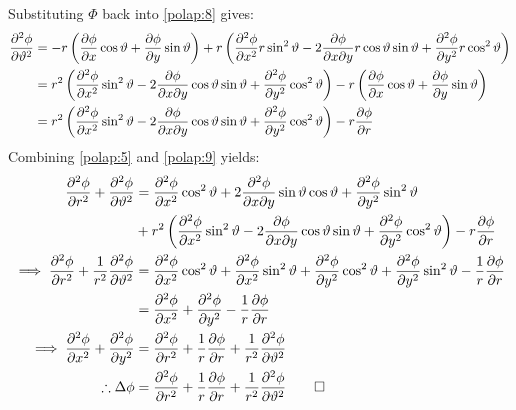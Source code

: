 Substituting $\Phi$ back into \ref{polap:8} gives:
\begin{align}
	\notag\frac{\partial^2\phi}{\partial\vartheta^2}&=-r\left(\frac{\partial \phi}{\partial x}\cos\vartheta+\frac{\partial \phi}{\partial y}\sin\vartheta\right)+r\left(\frac{\partial^2\phi}{\partial x^2}r\sin^2\vartheta-2\frac{\partial\phi}{\partial x\partial y}r\cos\vartheta\sin\vartheta+\frac{\partial^2\phi}{\partial y^2}r\cos^2\vartheta\right)\\
	\notag&=r^2\left(\frac{\partial^2\phi}{\partial x^2}\sin^2\vartheta-2\frac{\partial\phi}{\partial x\partial y}\cos\vartheta\sin\vartheta+\frac{\partial^2\phi}{\partial y^2}\cos^2\vartheta\right)-r\left(\frac{\partial \phi}{\partial x}\cos\vartheta+\frac{\partial \phi}{\partial y}\sin\vartheta\right)\\
	\label{polap:9}&=r^2\left(\frac{\partial^2\phi}{\partial x^2}\sin^2\vartheta-2\frac{\partial\phi}{\partial x\partial y}\cos\vartheta\sin\vartheta+\frac{\partial^2\phi}{\partial y^2}\cos^2\vartheta\right)-r\frac{\partial \phi}{\partial r}
\end{align}
Combining \ref{polap:5} and \ref{polap:9} yields:
\begin{align}
	\notag\frac{\partial^2\phi}{\partial r^2}+\frac{\partial^2\phi}{\partial\vartheta^2}&=\frac{\partial^2\phi}{\partial x^2}\cos^2\vartheta+2\frac{\partial^2\phi}{\partial x\partial y}\sin\vartheta\cos\vartheta+\frac{\partial^2\phi}{\partial y^2}\sin^2\vartheta\\
	\notag&+r^2\left(\frac{\partial^2\phi}{\partial x^2}\sin^2\vartheta-2\frac{\partial\phi}{\partial x\partial y}\cos\vartheta\sin\vartheta+\frac{\partial^2\phi}{\partial y^2}\cos^2\vartheta\right)-r\frac{\partial \phi}{\partial r}\\
	\notag\implies\frac{\partial^2\phi}{\partial r^2}+\frac{1}{r^2}\frac{\partial^2\phi}{\partial\vartheta^2}&=\frac{\partial^2\phi}{\partial x^2}\cos^2\vartheta+\frac{\partial^2\phi}{\partial x^2}\sin^2\vartheta+\frac{\partial^2\phi}{\partial y^2}\cos^2\vartheta+\frac{\partial^2\phi}{\partial y^2}\sin^2\vartheta-\frac{1}{r}\frac{\partial \phi}{\partial r}\\
	\notag&=\frac{\partial^2\phi}{\partial x^2}+\frac{\partial^2\phi}{\partial y^2}-\frac{1}{r}\frac{\partial \phi}{\partial r}\\
	\notag\implies\frac{\partial^2\phi}{\partial x^2}+\frac{\partial^2\phi}{\partial y^2}&=\frac{\partial^2\phi}{\partial r^2}+\frac{1}{r}\frac{\partial \phi}{\partial r}+\frac{1}{r^2}\frac{\partial^2\phi}{\partial\vartheta^2}\\
	\label{polap:final}\therefore\Delta\phi&=\frac{\partial^2\phi}{\partial r^2}+\frac{1}{r}\frac{\partial \phi}{\partial r}+\frac{1}{r^2}\frac{\partial^2\phi}{\partial\vartheta^2}\qed
\end{align}

